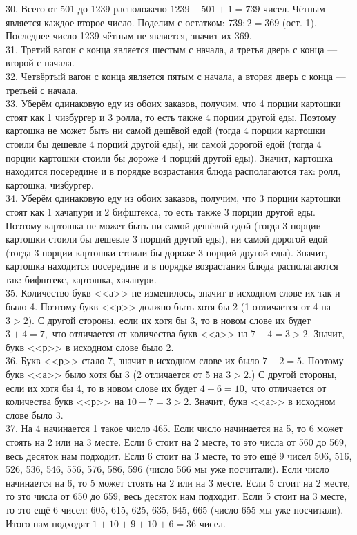 \documentclass[12pt]{article}
\begin{document}
30. Всего от 501 до 1239 расположено $1239-501+1=739$ чисел. Чётным является каждое второе число. Поделим с остатком: $739:2=369$ (ост. 1). Последнее число 1239 чётным не является, значит их 369.\\
31. Третий вагон с конца является шестым с начала, а третья дверь с конца --- второй с начала.\\
32. Четвёртый вагон с конца является пятым с начала, а вторая дверь с конца --- третьей с начала.\\
33. Уберём одинаковую еду из обоих заказов, получим, что 4 порции картошки стоят как 1 чизбургер и 3 ролла, то есть также 4 порции другой еды. Поэтому картошка не может быть ни самой дешёвой едой (тогда 4 порции картошки стоили бы дешевле 4 порций другой еды), ни самой дорогой едой (тогда 4 порции картошки стоили бы дороже 4 порций другой еды). Значит, картошка находится посередине и в порядке возрастания блюда располагаются так: ролл, картошка, чизбургер.\\
34. Уберём одинаковую еду из обоих заказов, получим, что 3 порции картошки стоят как 1 хачапури и 2 бифштекса, то есть также 3 порции другой еды. Поэтому картошка не может быть ни самой дешёвой едой (тогда 3 порции картошки стоили бы дешевле 3 порций другой еды), ни самой дорогой едой (тогда 3 порции картошки стоили бы дороже 3 порций другой еды). Значит, картошка находится посередине и в порядке возрастания блюда располагаются так: бифштекс, картошка, хачапури.\\
35. Количество букв <<а>> не изменилось, значит в исходном слове их так и было 4. Поэтому букв <<р>> должно быть хотя бы 2 (1 отличается от 4 на $3>2$). С другой стороны, если их хотя бы 3, то в новом слове их будет $3+4=7,$ что отличается от количества букв <<а>> на $7-4=3>2.$ Значит, букв <<р>> в исходном слове было 2.\\
36. Букв <<р>> стало 7, значит в исходном слове их было $7-2=5.$ Поэтому букв <<а>> было хотя бы 3 (2 отличается от 5 на $3>2.$) С другой стороны, если их хотя бы 4, то в новом слове  их будет $4+6=10,$ что отличается от количества букв <<р>> на $10-7=3>2.$ Значит, букв <<а>> в исходном слове было 3.\\
37. На 4 начинается 1 такое число 465. Если число начинается на 5, то 6 может стоять на 2 или на 3 месте. Если 6 стоит на 2 месте, то это числа от 560 до 569, весь десяток нам подходит. Если 6 стоит на 3 месте, то это ещё 9 чисел 506, 516, 526, 536, 546, 556, 576, 586, 596 (число 566 мы уже посчитали). Если число начинается на 6, то 5 может стоять на 2 или на 3 месте. Если 5 стоит на 2 месте, то это числа от 650 до 659, весь десяток нам подходит. Если 5 стоит на 3 месте, то это ещё 6 чисел: 605, 615, 625, 635, 645, 665 (число 655 мы уже посчитали). Итого нам подходят $1+10+9+10+6=36$ чисел.\\
\end{document}
